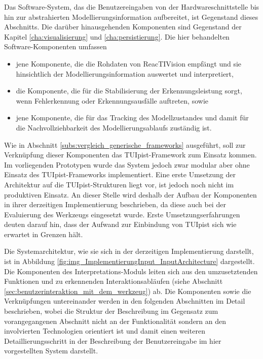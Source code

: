 Das Software-System, das die Benutzereingaben von der Hardwareschnittstelle bis hin zur abstrahierten Modellierungsinformation aufbereitet, ist Gegenstand dieses Abschnitts. Die darüber hinausgehenden Komponenten sind Gegenstand der Kapitel \ref{cha:visualisierung} und \ref{cha:persistierung}. Die hier behandelten Software-Komponenten umfassen
\begin{itemize}
	\item jene Komponente, die die Rohdaten von ReacTIVision empfängt und sie hinsichtlich der Modellierungsinformation auswertet und interpretiert,
	\item die Komponente, die für die Stabilisierung der Erkennungsleistung sorgt, wenn Fehlerkennung oder Erkennungsausfälle auftreten, sowie
	\item jene Komponente, die für das Tracking des Modellzustandes und damit für die Nachvollziehbarkeit des Modellierungsablaufs zuständig ist. 
\end{itemize}
Wie in Abschnitt \ref{subs:vergleich_generische_frameworks} ausgeführt, soll zur Verknüpfung dieser Komponenten das TUIpist-Framework zum Einsatz kommen. Im vorliegenden Prototypen wurde das System jedoch zwar modular aber ohne Einsatz des TUIpist-Frameworks implementiert. Eine erste Umsetzung der Architektur auf die TUIpist-Strukturen liegt vor, ist jedoch noch nicht im produktiven Einsatz. An dieser Stelle wird deshalb der Aufbau der Komponenten in ihrer derzeitigen Implementierung beschrieben, da diese auch bei der Evaluierung des Werkzeugs eingesetzt wurde. Erste Umsetzungserfahrungen deuten darauf hin, dass der Aufwand zur Einbindung von TUIpist sich wie erwartet in Grenzen hält.

Die Systemarchitektur, wie sie sich in der derzeitigen Implementierung darstellt, ist in Abbildung \ref{fig:img_ImplementierungInput_InputArchitecture} dargestellt. Die Komponenten des Interpretations-Moduls leiten sich aus den umzusetztenden Funktionen und zu erkennenden Interaktionsabläufen (siehe Abschnitt \ref{sec:benutzerinteraktion_mit_dem_werkzeug}) ab. Die Komponenten sowie die Verknüpfungen untereinander werden in den folgenden Abschnitten im Detail beschrieben, wobei die Struktur der Beschreibung im Gegensatz zum vorangegangenen Abschnitt nicht an der Funktionalität sondern an den involvierten Technologien orientiert ist und damit einen weiteren Detaillierungsschritt in der Beschreibung der Benutzereingabe im hier vorgestellten System darstellt.

